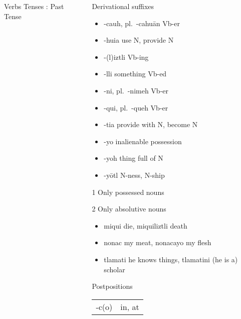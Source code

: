 \documentclass[12pt]{beamer}
\newcommand{\nah}[1]{\textcolor{nahgrn}{#1}}
\newcommand{\trs}[1]{\textcolor{nahblu}{#1}}
\begin{document}
\begin{frame}
\begin{columns}[t]
\begin{column}{.26\linewidth}
\begin{block}{Verbs Tenses : Past Tense}
    	\end{block}
    \end{column}
    \begin{column}{.20\linewidth}
      \begin{block}{Derivational suffixes}
      	\begin{threeparttable}
      		\begin{itemize}
      			\item \nah{-cauh}, pl.~\nah{-cahuān}  \trs{Vb-er}
      			\item \nah{-huia} \trs{use N, provide N}
      			\item \nah{-(l)iztli} \trs{Vb-ing}
      			\item \nah{-lli} \trs{something Vb-ed}
      			\item \nah{-ni}, pl.~\nah{-nimeh}  \trs{Vb-er}
      			\item \nah{-qui}, pl.~\nah{-queh}  \trs{Vb-er}
      			\item \nah{-tia} \trs{provide with N, become N}
      			\item \nah{-yo} inalienable possession
      			\item \nah{-yoh} \trs{thing full of N}
      			\item \nah{-yōtl} \trs{N-ness, N-ship}
      		\end{itemize}
      		\begin{tablenotes}
      			\item[1] Only possessed nouns
      			\item[2] Only absolutive nouns
      		\end{tablenotes}
      	\end{threeparttable}
      \end{block}
      \begin{example}
      	\begin{itemize}
      		\item \nah{miqui} \trs{die}, \nah{miquiliztli} \trs{death}
      		\item \nah{nonac} \trs{my meat}, \nah{nonacayo} \trs{my flesh}
      		\item \nah{tlamati} \trs{he knows things}, \nah{tlamatini} \trs{(he is a) scholar}
      	\end{itemize}
      \end{example}
      \begin{block}{Postpositions}
        \begin{tabular}{ll}
          \nah{-c(o)}     & \trs{in, at}                         \\

\end{tabular}
\end{block}
\end{column}
\end{columns}
\end{frame}
\end{document}
